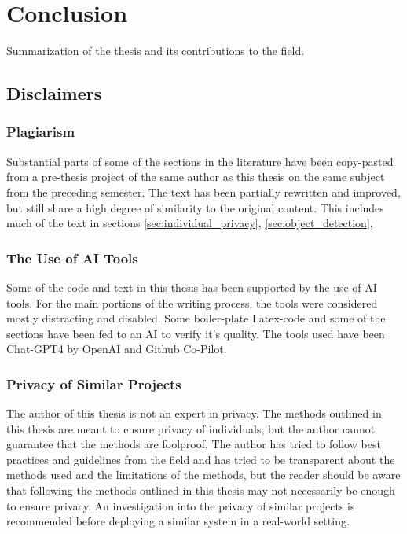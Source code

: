 \section{Conclusion}
\label{sec:conclusions}
Summarization of the thesis and its contributions to the field.


\subsection{Disclaimers}
\label{sec:disclaimers}

\subsubsection{Plagiarism}
Substantial parts of some of the sections in the literature have been copy-pasted from a pre-thesis project of the same author as this thesis on the same subject from the preceding semester. The text has been partially rewritten and improved, but still share a high degree of similarity to the original content. This includes much of the text in sections \ref{sec:individual_privacy}, \ref{sec:object_detection}, 

\subsubsection{The Use of AI Tools}
Some of the code and text in this thesis has been supported by the use of AI tools. For the main portions of the writing process, the tools were considered mostly distracting and disabled. Some boiler-plate Latex-code and some of the sections have been fed to an AI to verify it's quality. The tools used have been Chat-GPT4 by OpenAI and Github Co-Pilot.  

\subsubsection{Privacy of Similar Projects}
The author of this thesis is not an expert in privacy. The methods outlined in this thesis are meant to ensure privacy of individuals, but the author cannot guarantee that the methods are foolproof. The author has tried to follow best practices and guidelines from the field and has tried to be transparent about the methods used and the limitations of the methods, but the reader should be aware that following the methods outlined in this thesis may not necessarily be enough to ensure privacy. An investigation into the privacy of similar projects is recommended before deploying a similar system in a real-world setting.